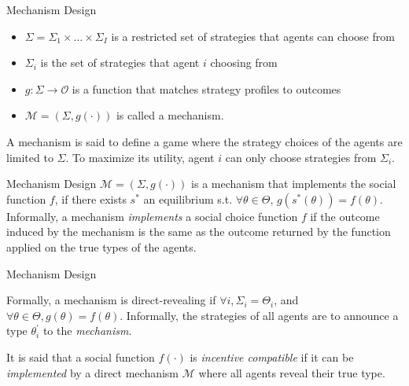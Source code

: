 \documentclass{beamer}
\begin{document}
\begin{frame}{Mechanism Design}
\begin{itemize}
    \pause
    \item $\Sigma=\Sigma_1 \times \dots \times \Sigma_I$ is a restricted set of strategies that agents can choose from \pause
    \item $\Sigma_i$ is the set of strategies that agent $i$ choosing from\pause
    \item $g:\Sigma\rightarrow\mathcal{O}$ is a function that matches strategy
        profiles to outcomes\pause
    \item $\mathcal{M}=(\Sigma,g(\cdot))$ is called a mechanism.\pause
\end{itemize}

A mechanism is said to define a game where the strategy choices
of the agents are limited to $\Sigma$. To maximize its utility,
agent $i$ can only choose strategies from $\Sigma_i$.

\end{frame}

\begin{frame}{Mechanism Design}
    \pause
    $\mathcal{M}=(\Sigma, g(\cdot))$ is a mechanism
    that implements the social function $f$, if there exists $s^*$ an
    equilibrium s.t. $\forall \theta\in\Theta$, $g(s^*(\theta))=f(\theta)$.\pause 
    \vspace{3mm}
    Informally, a mechanism \emph{implements} a social choice function $f$ if
    the outcome induced by the mechanism is the same as the outcome returned by
    the function applied on the true types of the agents.

\end{frame}

\begin{frame}{Mechanism Design}

    \pause
    Formally, a mechanism is direct-revealing if $\forall i,
    \Sigma_i=\Theta_i$, and $\forall \theta \in \Theta, g(\theta)=f(\theta)$.
    Informally, the strategies of all agents are to announce a type
    $\theta_i^{'}$ to the \emph{mechanism}.\pause

    \vspace{5mm}

    It is said that a social function
    $f(\cdot)$ is \emph{incentive compatible} if it can be \emph{implemented}
    by a direct mechanism $\mathcal{M}$ where all agents reveal their true type.
\end{frame}
\end{document}
